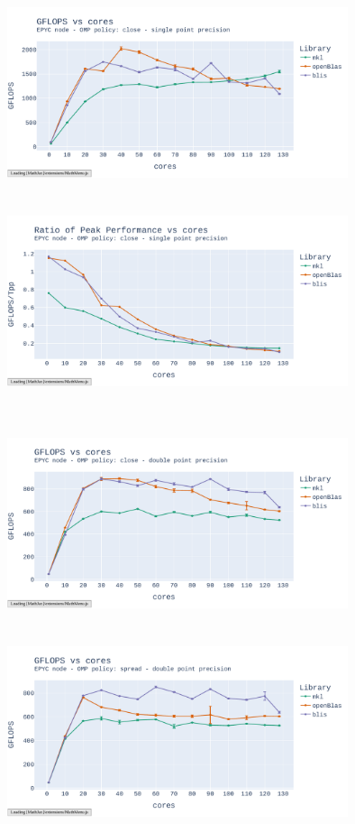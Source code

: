 \documentclass{report}
\begin{document}
\begin{figure}[h]
\hspace*{-2.5cm}
\includegraphics[width=10cm, height=6cm]{./images/fixed_size_epyc_float_gflops_close.pdf}
\includegraphics[width=10cm, height=6cm]{./images/fixed_size_epyc_float_gflops_close_ratio.pdf}
\caption{\label{fig:fixed_size_epyc_float} }
\end{figure}

\begin{figure}[h]
\hspace*{-2.5cm}
\includegraphics[width=10cm, height=6cm]{./images/fixed_size_epyc_double_gflops_close.pdf}
\includegraphics[width=10cm, height=6cm]{./images/fixed_size_epyc_double_gflops_spread.pdf}
\caption{\label{fig:fixed_size_epyc_double} }
\end{figure}
\end{document}
